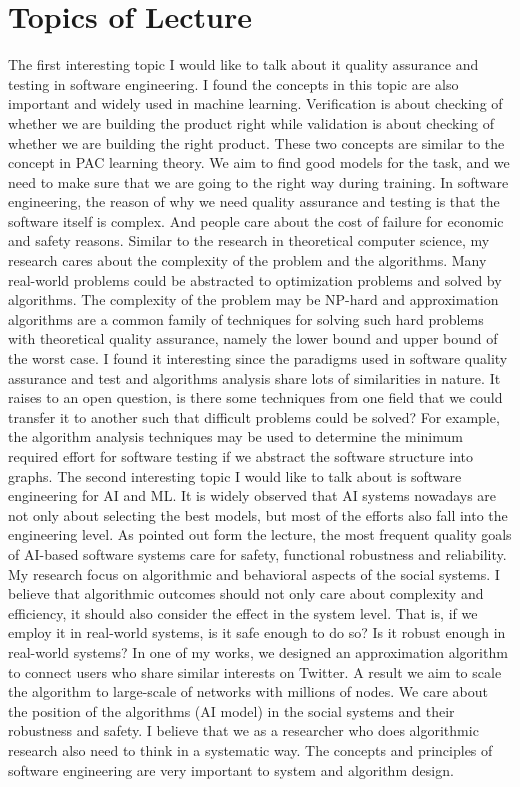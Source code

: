 \documentclass[11pt]{article}
\begin{document}
\section{Topics of Lecture} 
The first interesting topic I would like to talk about it quality assurance and testing in software engineering. I found the concepts in this topic are also important and widely used in machine learning. Verification is about checking of whether we are building the product right while validation is about checking of whether we are building the right product. These two concepts are similar to the concept in PAC learning theory. We aim to find good models for the task, and we need to make sure that we are going to the right way during training. In software engineering, the reason of why we need quality assurance and testing is that the software itself is complex. And people care about the cost of failure for economic and safety reasons. Similar to the research in theoretical computer science, my research cares about the complexity of the problem and the algorithms. Many real-world problems could be abstracted to optimization problems and solved by algorithms. The complexity of the problem may be NP-hard and approximation algorithms are a common family of techniques for solving such hard problems with theoretical quality assurance, namely the lower bound and upper bound of the worst case.  I found it interesting since the paradigms used in software quality assurance and test and algorithms analysis share lots of similarities in nature. It raises to an open question, is there some techniques from one field that we could transfer it to another such that difficult problems could be solved? For example, the algorithm analysis techniques may be used to determine the minimum required effort for software testing if we abstract the software structure into graphs.
The second interesting topic I would like to talk about is software engineering for AI and ML. It is widely observed that AI systems nowadays are not only about selecting the best models, but most of the efforts also fall into the engineering level.  As pointed out form the lecture, the most frequent quality goals of AI-based software systems care for safety, functional robustness and reliability. My research focus on algorithmic and behavioral aspects of the social systems. I believe that algorithmic outcomes should not only care about complexity and efficiency, it should also consider the effect in the system level. That is, if we employ it in real-world systems, is it safe enough to do so? Is it robust enough in real-world systems? In one of my works, we designed an approximation algorithm to connect users who share similar interests on Twitter.  A result we aim to scale the algorithm to large-scale of networks with millions of nodes. We care about the position of the algorithms (AI model) in the social systems and their robustness and safety. I believe that we as a researcher who does algorithmic research also need to think in a systematic way. The concepts and principles of software engineering are very important to system and algorithm design.
\end{document}
